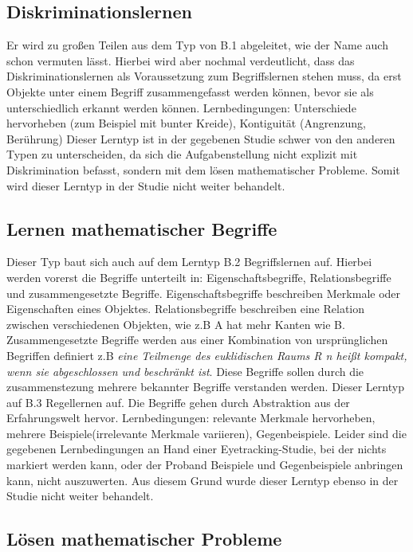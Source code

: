 \subsection[]{Diskriminationslernen}

Er wird zu großen Teilen aus dem Typ von B.1 abgeleitet, wie der Name auch schon vermuten lässt. Hierbei wird aber nochmal verdeutlicht, dass das Diskriminationslernen als Voraussetzung zum Begriffslernen stehen muss, da erst Objekte unter einem Begriff zusammengefasst werden können, bevor sie als unterschiedlich erkannt werden können.
Lernbedingungen: Unterschiede hervorheben (zum Beispiel mit bunter Kreide), Kontiguität (Angrenzung, Berührung)%
Dieser Lerntyp ist in der gegebenen Studie schwer von den anderen Typen zu unterscheiden, da sich die Aufgabenstellung nicht explizit mit Diskrimination befasst, sondern mit dem lösen mathematischer Probleme. Somit wird dieser Lerntyp in der Studie nicht weiter behandelt.

\subsection[]{Lernen mathematischer Begriffe}

Dieser Typ baut sich auch auf dem Lerntyp B.2 Begriffslernen auf. Hierbei werden vorerst die Begriffe unterteilt in: Eigenschaftsbegriffe, Relationsbegriffe und zusammengesetzte Begriffe. Eigenschaftsbegriffe beschreiben Merkmale oder Eigenschaften eines Objektes. Relationsbegriffe beschreiben eine Relation zwischen verschiedenen Objekten, wie z.B A hat mehr Kanten wie B. Zusammengesetzte Begriffe werden aus einer Kombination von ursprünglichen Begriffen definiert z.B \textit{ eine Teilmenge des euklidischen Raums R n heißt kompakt, wenn sie abgeschlossen und beschränkt ist}. Diese Begriffe sollen durch die zusammenstezung mehrere bekannter Begriffe verstanden werden. Dieser Lerntyp auf B.3 Regellernen auf. Die Begriffe gehen durch Abstraktion aus der Erfahrungswelt hervor.
Lernbedingungen: relevante Merkmale hervorheben, mehrere Beispiele(irrelevante Merkmale variieren), Gegenbeispiele.
Leider sind die gegebenen Lernbedingungen an Hand einer Eyetracking-Studie, bei der nichts markiert werden kann, oder der Proband Beispiele und Gegenbeispiele anbringen kann, nicht auszuwerten. Aus diesem Grund wurde dieser Lerntyp ebenso in der Studie nicht weiter behandelt. 

\subsection[]{Lösen mathematischer Probleme}


